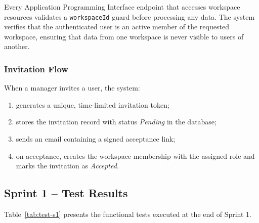 \documentclass[12pt,a4paper]{report}
\begin{document}
Every Application Programming Interface endpoint that accesses workspace resources validates a \texttt{workspaceId}
guard before processing any data.
The system verifies that the authenticated user is an active member of the requested
workspace, ensuring that data from one workspace is never visible to users of another.

\subsubsection{Invitation Flow}

When a manager invites a user, the system:
\begin{enumerate}
  \item generates a unique, time-limited invitation token;
  \item stores the invitation record with status \textit{Pending} in the database;
  \item sends an email containing a signed acceptance link;
  \item on acceptance, creates the workspace membership with the assigned role
        and marks the invitation as \textit{Accepted}.
\end{enumerate}

\subsection{Sprint 1 -- Test Results}

Table~\ref{tab:test-s1} presents the functional tests executed at the end of Sprint 1.
\end{document}
